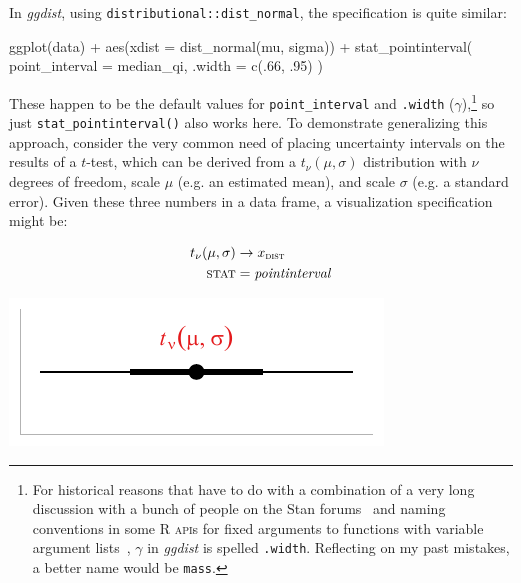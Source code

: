 \documentclass[journal]{vgtc}                     %
\newenvironment{centerverbatim}{%
  \hfill\break
  \small
  \centering
  \varwidth{\linewidth}%
  \verbatim
}{%
  \endverbatim
  \endvarwidth
  \par
  \hfill\break
}
\begin{document}
In \textit{ggdist}, using \texttt{distributional::dist\_normal}, the specification is quite similar:

\begin{centerverbatim}
ggplot(data) +
  aes(xdist = dist_normal(mu, sigma)) +
  stat_pointinterval(
    point_interval = median_qi, 
    .width = c(.66, .95)
  )
\end{centerverbatim}

These happen to be the default values for \texttt{point\_interval} and \texttt{.width} ($\gamma$),\footnote{For historical reasons that have to do with a combination of a very long discussion with a bunch of people on the Stan forums~\cite{kay2018stannames} and naming conventions in some R \textsc{api}s for fixed arguments to functions with variable argument lists~\cite{tidyverse2020dotprefix}, $\gamma$ in \textit{ggdist} is spelled \texttt{.width}. Reflecting on my past mistakes, a better name would be  \texttt{mass}.} so just \texttt{stat\_pointinterval()}  also works here. To demonstrate generalizing this approach, consider the very common need of placing uncertainty intervals on the results of a $t$-test, which can be derived from a $t_\nu(\mu, \sigma)$  distribution with $\nu$ degrees of freedom, scale $\mu$ (e.g. an estimated mean), and scale $\sigma$ (e.g. a standard error). Given these three numbers in a data frame, a visualization specification might be:

\noindent
\begin{minipage}{.5\columnwidth}

\begin{align*}
t_{\nu}(\mu, \sigma) &\rightarrow x_\textsc{dist}\\
\textsc{stat} &= \mathit{pointinterval}
\end{align*}
\end{minipage}%
  \begin{minipage}{.4\columnwidth}
    \centering
    \includegraphics[width=1.2\columnwidth]{figs/3-stat_pointinterval_student_t.pdf}
  \end{minipage}
\hfill\break
\end{document}
